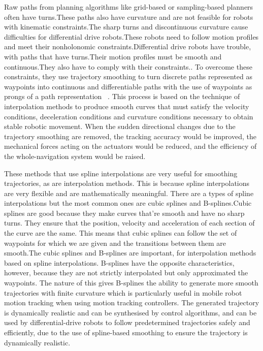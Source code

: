Raw paths from planning algorithms like grid-based or sampling-based planners often have turns.These paths also have curvature and are not feasible for robots with kinematic constraints.The sharp turns and discontinuous curvature cause difficulties for differential drive robots.These robots need to follow motion profiles and meet their nonholonomic constraints.Differential drive robots have trouble, with paths that have turns.Their motion profiles must be smooth and continuous.They also have to comply with their constraints.. To overcome these constraints, they use trajectory smoothing to turn discrete paths represented as waypoints into continuous and differentiable paths with the use of waypoints as prongs of a path representation ~\cite{ravankar2018path}. This process is based on the technique of interpolation methods to produce smooth curves that must satisfy the velocity conditions, deceleration conditions and curvature conditions necessary to obtain stable robotic movement. When the sudden directional changes due to the trajectory smoothing are removed, the tracking accuracy would be improved, the mechanical forces acting on the actuators would be reduced, and the efficiency of the whole-navigation system would be raised.  

These methods that use spline interpolations are very useful for smoothing trajectories, as are interpolation methods. This is because spline interpolations are very flexible and are mathematically meaningful. There are a types of spline interpolations but the most common ones are cubic splines and B-splines.Cubic splines are good because they make curves that're smooth and have no sharp turns. They ensure that the position, velocity and acceleration of each section of the curve are the same. This means that cubic splines can follow the set of waypoints for which we are given and the transitions between them are smooth.The cubic splines and B-splines are important, for interpolation methods based on spline interpolations. B-splines have the opposite characteristics, however, because they are not strictly interpolated but only approximated the waypoints. The nature of this gives B-splines the ability to generate more smooth trajectories with finite curvature which is particularly useful in mobile robot motion tracking when using motion tracking controllers. The generated trajectory is dynamically realistic and can be synthesised by control algorithms, and can be used by differential-drive robots to follow predetermined trajectories safely and efficiently, due to the use of spline-based smoothing to ensure the trajectory is dynamically realistic.

